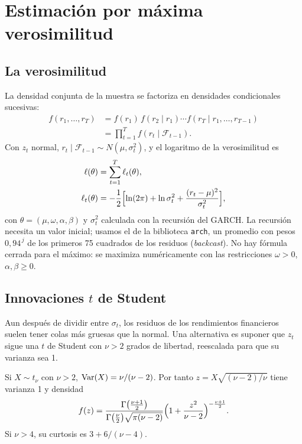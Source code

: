 \section{Estimación por máxima verosimilitud}

\subsection{La verosimilitud}
La densidad conjunta de la muestra se factoriza en densidades condicionales sucesivas:
\begin{align*}
  f(r_1,\dots,r_T) &= f(r_1)\,f(r_2\mid r_1)\cdots f(r_T\mid r_1,\dots,r_{T-1})\\
                   &= \prod_{t=1}^{T}f(r_t\mid\mathcal F_{t-1}).
\end{align*}
Con $z_t$ normal, $r_t\mid\mathcal F_{t-1}\sim N(\mu,\sigma_t^2)$, y el logaritmo de la verosimilitud es
\begin{align*}
  \ell(\theta) &= \sum_{t=1}^{T}\ell_t(\theta),\\
  \ell_t(\theta) &= -\frac12\Bigl[\ln(2\pi)+\ln\sigma_t^2+\frac{(r_t-\mu)^2}{\sigma_t^2}\Bigr],
\end{align*}
con $\theta=(\mu,\omega,\alpha,\beta)$ y $\sigma_t^2$ calculada con la recursión del GARCH. La recursión
necesita un valor inicial; usamos el de la biblioteca \texttt{arch}, un promedio con pesos $0{,}94^{\,j}$ de los
primeros 75 cuadrados de los residuos (\emph{backcast}). No hay fórmula cerrada para el máximo: se maximiza
numéricamente con las restricciones $\omega>0$, $\alpha,\beta\ge0$.

\subsection{Innovaciones $t$ de Student}
Aun después de dividir entre $\sigma_t$, los residuos de los rendimientos financieros suelen tener colas más
gruesas que la normal. Una alternativa es suponer que $z_t$ sigue una $t$ de Student con $\nu>2$ grados de
libertad, reescalada para que su varianza sea 1.

\begin{proposicion}\label{prop:tstd}
Si $X\sim t_\nu$ con $\nu>2$, $\operatorname{Var}(X)=\nu/(\nu-2)$. Por tanto $z=X\sqrt{(\nu-2)/\nu}$ tiene varianza 1 y
densidad
\[
  f(z)=\frac{\Gamma\bigl(\frac{\nu+1}2\bigr)}{\Gamma\bigl(\frac\nu2\bigr)\sqrt{\pi(\nu-2)}}
       \Bigl(1+\frac{z^2}{\nu-2}\Bigr)^{-\frac{\nu+1}2}.
\]
Si $\nu>4$, su curtosis es $3+6/(\nu-4)$.
\end{proposicion}

